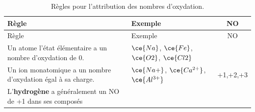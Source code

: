 \documentclass[
  11pt,
  french,
  a4paper,
  openany]{book}
\begin{document}
\begin{longtable}[]{@{}llc@{}}
\caption{\label{tab:tab-NO-rules} Règles pour l'attribution des nombres d'oxydation.}\tabularnewline
\toprule
\begin{minipage}[b]{0.48\columnwidth}\raggedright
Règle\strut
\end{minipage} & \begin{minipage}[b]{0.35\columnwidth}\raggedright
Exemple\strut
\end{minipage} & \begin{minipage}[b]{0.08\columnwidth}\centering
NO\strut
\end{minipage}\tabularnewline
\midrule
\endfirsthead
\toprule
\begin{minipage}[b]{0.48\columnwidth}\raggedright
Règle\strut
\end{minipage} & \begin{minipage}[b]{0.35\columnwidth}\raggedright
Exemple\strut
\end{minipage} & \begin{minipage}[b]{0.08\columnwidth}\centering
NO\strut
\end{minipage}\tabularnewline
\midrule
\endhead
\begin{minipage}[t]{0.48\columnwidth}\raggedright
Un atome l'état élémentaire a un nombre d'oxydation de 0.\strut
\end{minipage} & \begin{minipage}[t]{0.35\columnwidth}\raggedright
\(\ce{Na}\), \(\ce{Fe}\), \(\ce{O2}\), \(\ce{Cl2}\)\strut
\end{minipage} & \begin{minipage}[t]{0.08\columnwidth}\centering
0\strut
\end{minipage}\tabularnewline
\begin{minipage}[t]{0.48\columnwidth}\raggedright
Un ion monatomique a un nombre d'oxydation égal à sa charge.\strut
\end{minipage} & \begin{minipage}[t]{0.35\columnwidth}\raggedright
\(\ce{Na+}\), \(\ce{Ca^{2+}}\), \(\ce{Al^{3+}}\)\strut
\end{minipage} & \begin{minipage}[t]{0.08\columnwidth}\centering
+1,+2,+3\strut
\end{minipage}\tabularnewline
\begin{minipage}[t]{0.48\columnwidth}\raggedright
L'\textbf{hydrogène} a généralement un NO de +1 dans ses composés\strut
\end{minipage} & \begin{minipage}[t]{0.35\columnwidth}\raggedright

\end{minipage}
\end{longtable}
\end{document}
